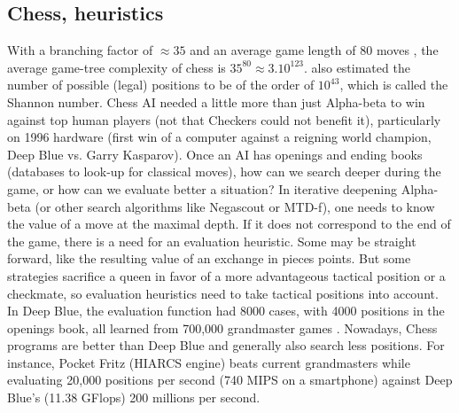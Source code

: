 \subsection{Chess, heuristics}
With a branching factor of $\approx 35$ and an average game length of 80 moves \citep{Shannon_1950}, the average game-tree complexity of chess is $35^{80}\approx 3.10^{123}$. \citet{Shannon_1950} also estimated the number of possible (legal) positions to be of the order of $10^{43}$, which is called the Shannon number. Chess AI needed a little more than just Alpha-beta to win against top human players (not that Checkers could not benefit it), particularly on 1996 hardware (first win of a computer against a reigning world champion, Deep Blue vs. Garry Kasparov). Once an AI has openings and ending books (databases to look-up for classical moves), how can we search deeper during the game, or how can we evaluate better a situation? In iterative deepening Alpha-beta (or other search algorithms like Negascout \citep{reinfeld1983negascout} or MTD-f\citep{Plaat1996}), one needs to know the value of a move at the maximal depth. If it does not correspond to the end of the game, there is a need for an evaluation heuristic. Some may be straight forward, like the resulting value of an exchange in pieces points. But some strategies sacrifice a queen in favor of a more advantageous tactical position or a checkmate, so evaluation heuristics need to take tactical positions into account. In Deep Blue, the evaluation function had 8000 cases, with 4000 positions in the openings book, all learned from 700,000 grandmaster games \citep{DeepBlue}. Nowadays, Chess programs are better than Deep Blue and generally also search less positions. For instance, Pocket Fritz (HIARCS engine) beats current grandmasters \citep{PocketFritz,CopaMercosur} while evaluating 20,000 positions per second (740 MIPS on a smartphone) against Deep Blue's (11.38 GFlops) 200 millions per second.

